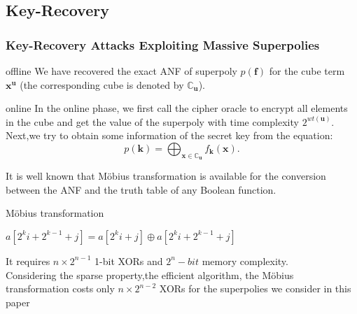 \documentclass[notheorems,aspectratio=169]{beamer}
\def\bd#1{\boldsymbol{#1}}
\begin{document}
\subsection{Key-Recovery}
\begin{frame}
    \frametitle{Key-Recovery Attacks Exploiting Massive Superpolies}
    \begin{block}{offline}
        We have recovered the exact ANF of superpoly $p(\bd{f})$ for the cube term $\bd{x}^{\bd{u}}$ (the 
        corresponding cube is denoted by $\mathbb{C}_{\bd{u}}$).
    \end{block}
    \begin{block}{online}
        In the online phase, we first call the cipher oracle to encrypt all elements in the cube and get the value of
        the superpoly with time complexity $2^{wt(\bd{u})}$.\\
        Next,we try to obtain some information of the secret key from the equation:
        $$
        p(\bd{k})=\bigoplus _{\bd{x}\in \mathbb{C}_{\bd{u}}} f_{\bd{k}}(\bd{x}).
        $$
        
    \end{block}
\end{frame}
\begin{frame}
    It is well known that Möbius transformation is available for the conversion 
    between the ANF and the truth table of any Boolean function.
    \begin{algorithm}[H]
        \caption{Möbius transformation }
        \begin{algorithmic}[1]
            \State $a[2^ki+2^{k-1}+j]=a[2^ki+j]\oplus a[2^ki+2^{k-1}+j]$ 

        \end{algorithmic}
    \end{algorithm}
    It requires {\color{red}$n \times 2^{n-1}$} 1-bit XORs and {\color{red}$2^n-bit$} memory complexity.\\
    Considering the sparse property,the efficient algorithm, the Möbius transformation
    costs only  {\color{red}$n \times 2^{n-2}$} XORs for the superpolies we consider in this paper
        
\end{frame}
\end{document}
